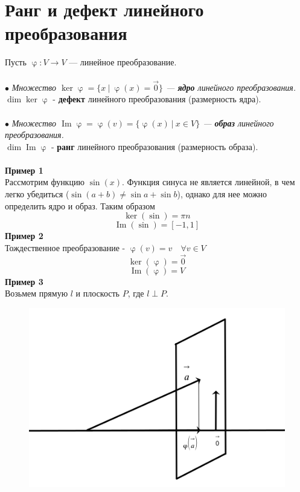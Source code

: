 \documentclass[a4paper, 12pt]{article}
\renewcommand{\Im}{\operatorname{Im}}
\renewcommand{\ker}{\operatorname{ker}}
\renewcommand{\varphi}{\upvarphi}
\begin{document}
\section{Ранг и дефект линейного преобразования}
Пусть $\varphi:V\rightarrow V$ --- линейное преобразование.\\\\
$\bullet$ \textit{Множество $\ker \varphi = \{x\ |\ \varphi(x)=\vec 0\}$ --- \textbf{ядро} линейного преобразования.}\\
$\dim \ker \varphi$ - \textbf{дефект} линейного преобразования (размерность ядра).\\\\
$\bullet$ \textit{Множество $\Im \varphi = \varphi(v)=\{\varphi(x)\ |\ x \in V\}$ --- \textbf{образ} линейного преобразования.}\\
$\dim \Im \varphi$ - \textbf{ранг} линейного преобразования (размерность образа).\\\\
\textbf{Пример 1}\\
Рассмотрим функцию $\sin(x)$. Функция синуса не является линейной, в чем легко убедиться ($\sin(a+b) \neq \sin a + \sin b$), однако для нее можно определить ядро и образ. Таким образом
$$\ker (\sin) = {\pi n}$$
$$\Im (\sin) = [-1,1]$$
\textbf{Пример 2}\\
Тождественное преобразование - $\varphi(v)=v \quad \forall v \in V$
$$\ker( \varphi) = \vec 0$$
$$\Im (\varphi) = V$$
\textbf{Пример 3}\\
Возьмем прямую $l$ и плоскость $P$, где $l \perp P$.
\begin{figure}[h]
    \begin{center}
    \includegraphics[scale=0.8]{0st25sYXFU (1).png}
    \end{center}
    \end{figure}\\
\end{document}
